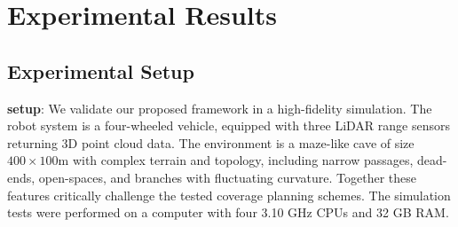 \documentclass{article}
\newcommand{\ph}[1]{{\textbf{#1}:}} %
\begin{document}

\section{Experimental Results}\label{sec:exp_results}









\subsection{Experimental Setup}





\ph{setup}
We validate our proposed framework in a high-fidelity simulation. The robot system is a four-wheeled vehicle, equipped with three LiDAR range sensors returning 3D point cloud data. The environment is a maze-like cave of size $400 \times 100$m with complex terrain and topology, including narrow passages, dead-ends, open-spaces, and branches with fluctuating curvature. Together these features critically challenge the tested coverage planning schemes. The simulation tests were performed on a computer with four 3.10 GHz CPUs and 32 GB RAM.
\end{document}
